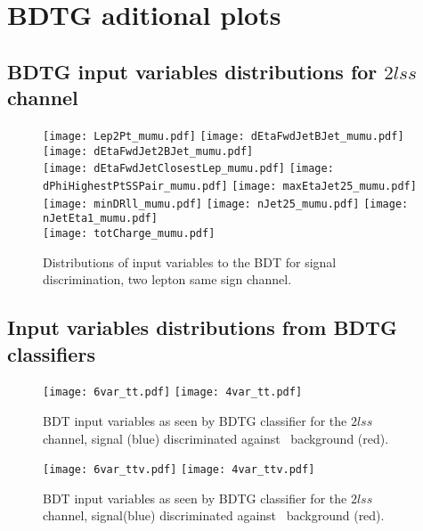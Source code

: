 \chapter{BDTG aditional plots}

\section{BDTG input variables distributions for $2lss$ channel }

\begin{figure} [!h]
  \centering
  \texttt{[image: Lep2Pt\_mumu.pdf]}
  \texttt{[image: dEtaFwdJetBJet\_mumu.pdf]}
  \texttt{[image: dEtaFwdJet2BJet\_mumu.pdf]}\\
  \texttt{[image: dEtaFwdJetClosestLep\_mumu.pdf]}
  \texttt{[image: dPhiHighestPtSSPair\_mumu.pdf]}
  \texttt{[image: maxEtaJet25\_mumu.pdf]}\\
  \texttt{[image: minDRll\_mumu.pdf]}
  \texttt{[image: nJet25\_mumu.pdf]}
  \texttt{[image: nJetEta1\_mumu.pdf]}\\
  \texttt{[image: totCharge\_mumu.pdf]}
  \caption{Distributions of input variables to the BDT for signal discrimination, two lepton same sign channel.}
  \label{fig:input_vars_2lss}
\end{figure}  
\newpage
\section{Input variables distributions from BDTG classifiers}

\begin{figure} [!h]
  \centering
  \texttt{[image: 6var\_tt.pdf]}
  \texttt{[image: 4var\_tt.pdf]}
  \caption[BDT input variables. Discrimination against \ttbar\ in $2lss$ channel.]{BDT input variables as seen by BDTG classifier for the $2lss$ channel, \tHq signal (blue) discriminated against \ttbar\ background (red).}
  \label{mva_input_2lss_tt}
\end{figure}

\begin{figure} [!h]
  \centering
  \texttt{[image: 6var\_ttv.pdf]}
  \texttt{[image: 4var\_ttv.pdf]}
  \caption[BDT input variables. Discrimination against \ttV\ in $2lss$ channel.]{BDT input variables as seen by BDTG classifier for the $2lss$ channel, \tHq signal(blue) discriminated against \ttV\ background (red).}
  \label{mva_input_2lss_ttv}
\end{figure}

